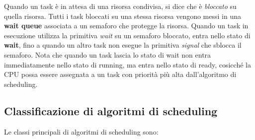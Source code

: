 \documentclass[12pt]{article}
\begin{document}
\noindent Quando un task è in attesa di una risorsa condivisa, si dice che è \textit{bloccato} su quella risorsa.
Tutti i task bloccati su una stessa risorsa vengono messi in una \textbf{wait queue} associata a un semaforo che protegge la risorsa.
Quando un task in esecuzione utilizza la primitiva \textit{wait} su un semaforo bloccato, entra nello stato di \textbf{wait}, fino a quando un altro task non esegue la primitiva \textit{signal} che sblocca il semaforo.
Nota che quando un task lascia lo stato di wait non entra immediatamente nello stato di running, ma entra nello stato di ready, cosicché la CPU possa essere assegnata a un task con priorità più alta dall'algoritmo di scheduling.

\subsection{Classificazione di algoritmi di scheduling}
Le classi principali di algoritmi di scheduling sono:
\end{document}
